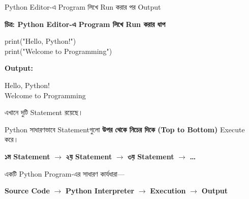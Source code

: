 
{Python Editor-এ Program লিখে Run করার পর Output}

\begin{center}
\footnotesize\textbf{চিত্র: Python Editor-এ Program লিখে Run করার ধাপ}
\end{center}


\begin{codebox}

\begin{english}
\ttfamily
print("Hello, Python!")\\
print("Welcome to Programming")
\end{english}

\end{codebox}

\textbf{Output:}

\begin{codebox}

\begin{english}
\ttfamily
Hello, Python!\\
Welcome to Programming
\end{english}

\end{codebox}

এখানে দুটি Statement রয়েছে।

Python সাধারণভাবে Statementগুলো
\textbf{উপর থেকে নিচের দিকে (Top to Bottom)}
Execute করে।

\begin{center}

\textbf{১ম Statement}
\(\longrightarrow\)
\textbf{২য় Statement}
\(\longrightarrow\)
\textbf{৩য় Statement}
\(\longrightarrow\)
\textbf{\dots}

\end{center}



একটি Python Program-এর সাধারণ কার্যধারা—

\begin{center}

\textbf{Source Code}
\(\longrightarrow\)
\textbf{Python Interpreter}
\(\longrightarrow\)
\textbf{Execution}
\(\longrightarrow\)
\textbf{Output}

\end{center}

